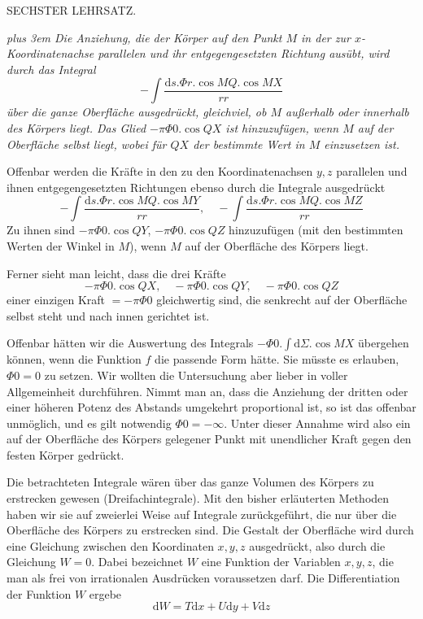 \par\medskip{}
\centerline{SECHSTER LEHRSATZ.}\medskip
\par
{\itshape\rightskip=0pt plus 3em Die Anziehung, die der Körper auf den Punkt $M$ in der zur $x$-Koordinatenachse parallelen und ihr entgegengesetzten Richtung ausübt, wird durch das Integral
\[
-\int\frac{\mathrm{d}s.\Phi r.\cos MQ.\cos MX}{rr}
\]
über die ganze Oberfläche ausgedrückt, gleichviel, ob $M$ außerhalb oder innerhalb des Körpers liegt. Das Glied $-\pi\Phi0.\cos QX$ ist hinzuzufügen, wenn $M$ auf der Oberfläche selbst liegt, wobei für $QX$ der bestimmte Wert in $M$ einzusetzen ist.\par}\par
Offenbar werden die Kräfte in den zu den Koordinatenachsen $y,z$ parallelen und ihnen entgegengesetzten Richtungen ebenso durch die Integrale ausgedrückt
\[
-\int\frac{\mathrm{d}s.\Phi r.\cos MQ.\cos MY}{rr},\quad-\int\frac{\mathrm{d}s.\Phi r.\cos MQ.\cos MZ}{rr}
\]
Zu ihnen sind $-\pi\Phi0.\cos QY$, $-\pi\Phi0.\cos QZ$ hinzuzufügen (mit den bestimmten Werten der Winkel in $M$), wenn $M$ auf der Oberfläche des Körpers liegt.

Ferner sieht man leicht, dass die drei Kräfte
\[
-\pi\Phi0.\cos QX,\quad-\pi\Phi0.\cos QY,\quad-\pi\Phi0.\cos QZ
\]
einer einzigen Kraft $=-\pi\Phi0$ gleichwertig sind, die senkrecht auf der Oberfläche selbst steht und nach innen gerichtet ist.

Offenbar hätten wir die Auswertung des Integrals $-\Phi0.\int\mathrm{d}\Sigma.\cos MX$ übergehen können, wenn die Funktion $f$ die passende Form hätte. Sie müsste es erlauben, $\Phi0=0$ zu setzen. Wir wollten die Untersuchung aber lieber in voller Allgemeinheit durchführen. Nimmt man an, dass die Anziehung der dritten oder einer höheren Potenz des Abstands umgekehrt proportional ist, so ist das offenbar unmöglich, und es gilt notwendig $\Phi0=-\infty$. Unter dieser Annahme wird also ein auf der Oberfläche des Körpers gelegener Punkt mit unendlicher Kraft gegen den festen Körper gedrückt.

\par
Die betrachteten Integrale wären über das ganze Volumen des Körpers zu erstrecken gewesen (Dreifachintegrale). Mit den bisher erläuterten Methoden haben wir sie auf zweierlei Weise auf Integrale zurückgeführt, die nur über die Oberfläche des Körpers zu erstrecken sind. Die Gestalt der Oberfläche wird durch eine Gleichung zwischen den Koordinaten $x,y,z$ ausgedrückt, also durch die Gleichung $W=0$. Dabei bezeichnet $W$ eine Funktion der Variablen $x,y,z$, die man als frei von irrationalen Ausdrücken voraussetzen darf. Die Differentiation der Funktion $W$ ergebe
\[
\mathrm{d}W=T\mathrm{d}x+U\mathrm{d}y+V\mathrm{d}z
\]
